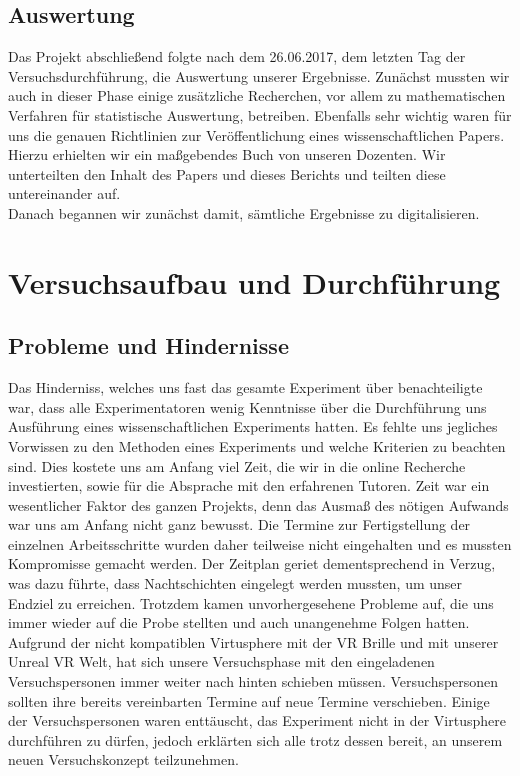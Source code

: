 \documentclass{Bericht}
\begin{document}
	\subsection{Auswertung} %
		Das Projekt abschließend folgte nach dem 26.06.2017, dem letzten Tag der Versuchsdurchführung, die Auswertung unserer Ergebnisse.
		Zunächst mussten wir auch in dieser Phase einige zusätzliche Recherchen, vor allem zu mathematischen Verfahren für statistische Auswertung, betreiben. Ebenfalls sehr wichtig waren für uns die genauen Richtlinien zur Veröffentlichung eines wissenschaftlichen Papers. Hierzu erhielten wir ein maßgebendes Buch von unseren Dozenten. Wir unterteilten den Inhalt des Papers und dieses Berichts und teilten diese untereinander auf.\\
		Danach begannen wir zunächst damit, sämtliche Ergebnisse zu digitalisieren.

\clearpage
	\section{Versuchsaufbau und Durchführung} %


\subsection{Probleme und Hindernisse}
Das Hinderniss, welches uns fast das gesamte Experiment über benachteiligte war, dass alle Experimentatoren wenig Kenntnisse über die Durchführung uns Ausführung eines wissenschaftlichen Experiments hatten. Es fehlte uns jegliches Vorwissen zu den Methoden eines Experiments und welche Kriterien zu beachten sind. Dies kostete uns am Anfang viel Zeit, die wir in die online Recherche investierten, sowie für die Absprache mit den erfahrenen Tutoren. Zeit war ein wesentlicher Faktor des ganzen Projekts, denn das Ausmaß des nötigen Aufwands war uns am Anfang nicht ganz bewusst. Die Termine zur Fertigstellung der einzelnen Arbeitsschritte wurden daher teilweise nicht eingehalten und es mussten Kompromisse gemacht werden. Der Zeitplan geriet dementsprechend in Verzug, was dazu führte, dass Nachtschichten eingelegt werden mussten, um unser Endziel zu erreichen. Trotzdem kamen unvorhergesehene Probleme auf, die uns immer wieder auf die Probe stellten und auch unangenehme Folgen hatten. Aufgrund der nicht kompatiblen Virtusphere mit der VR Brille und mit unserer Unreal VR Welt, hat sich unsere Versuchsphase mit den eingeladenen Versuchspersonen immer weiter nach hinten schieben müssen. Versuchspersonen sollten ihre bereits vereinbarten Termine auf neue Termine verschieben. Einige der Versuchspersonen waren enttäuscht, das Experiment nicht in der Virtusphere durchführen zu dürfen, jedoch erklärten sich alle trotz dessen bereit, an unserem neuen Versuchskonzept teilzunehmen.
\end{document}
